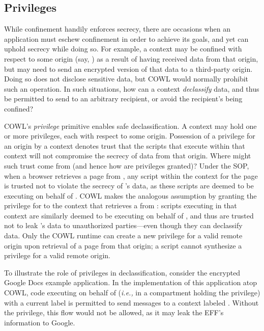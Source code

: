 \subsection{Privileges}
\label{sec:system:privileges}

While confinement handily enforces secrecy, there are occasions when
an application must eschew confinement in order to achieve its goals,
and yet can uphold secrecy while doing so. For example, a context may
be confined with respect to some origin (say, ) as a
result of having received data from that origin, but may need to send
an encrypted version of that data to a third-party origin. Doing so
does not disclose sensitive data, but COWL would normally prohibit
such an operation. In such situations, how can a context
\emph{declassify} data, and thus be permitted to send to an arbitrary
recipient, or avoid the recipient's being confined?

COWL's {\em privilege} primitive enables safe declassification. A
context may hold one or more privileges, each with respect to some
origin. Possession of a privilege for an origin by a context denotes
trust that the scripts that execute within that context will not
compromise the secrecy of data from that origin. Where might such
trust come from (and hence how are privileges granted)? Under the SOP,
when a browser retrieves a page from , any script within
the context for the page is trusted not to violate the secrecy of
's data, as these scripts are deemed to be executing on
behalf of . COWL makes the analogous assumption by
granting the privilege for  to the context that retrieves
a from : scripts executing in that context
are similarly deemed to be executing on behalf of , and
thus are trusted not to leak 's data to unauthorized
parties---even though they can declassify data. Only the COWL runtime
can create a new privilege for a valid remote origin upon
retrieval of a page from that origin; a script cannot synthesize a
privilege for a valid remote origin.

To illustrate the role of privileges in declassification, consider the
encrypted Google Docs example application. In the implementation
of this application atop COWL, code executing on behalf of
 (\emph{i.e.,} in a compartment holding the 
privilege) with a current label  is permitted to send messages to a context
labeled .
%
Without the  privilege, this flow would not be allowed,
as it may leak the EFF's information to Google.
%

